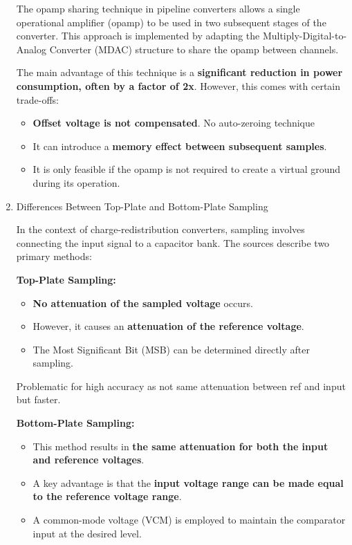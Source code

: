 \documentclass[
  a4paper,
]{article}
\providecommand{\tightlist}{%
  \setlength{\itemsep}{0pt}\setlength{\parskip}{0pt}}
\begin{document}
\begin{enumerate}
  The opamp sharing technique in pipeline converters allows a single
  operational amplifier (opamp) to be used in two subsequent stages of
  the converter. This approach is implemented by adapting the
  Multiply-Digital-to-Analog Converter (MDAC) structure to share the
  opamp between channels.

  The main advantage of this technique is a \textbf{significant
  reduction in power consumption, often by a factor of 2x}. However,
  this comes with certain trade-offs:

  \begin{itemize}
  \tightlist
  \item
    \textbf{Offset voltage is not compensated}. No auto-zeroing
    technique
  \item
    It can introduce a \textbf{memory effect between subsequent
    samples}.
  \item
    It is only feasible if the opamp is not required to create a virtual
    ground during its operation.
  \end{itemize}
\item
  Differences Between Top-Plate and Bottom-Plate Sampling

  In the context of charge-redistribution converters, sampling involves
  connecting the input signal to a capacitor bank. The sources describe
  two primary methods:

  \textbf{Top-Plate Sampling:}

  \begin{itemize}
  \tightlist
  \item
    \textbf{No attenuation of the sampled voltage} occurs.
  \item
    However, it causes an \textbf{attenuation of the reference voltage}.
  \item
    The Most Significant Bit (MSB) can be determined directly after
    sampling.
  \end{itemize}

  Problematic for high accuracy as not same attenuation between ref and
  input but faster.

  \textbf{Bottom-Plate Sampling:}

  \begin{itemize}
  \tightlist
  \item
    This method results in \textbf{the same attenuation for both the
    input and reference voltages}.
  \item
    A key advantage is that the \textbf{input voltage range can be made
    equal to the reference voltage range}.
  \item
    A common-mode voltage (VCM) is employed to maintain the comparator
    input at the desired level.
  \end{itemize}


\end{enumerate}
\end{document}
